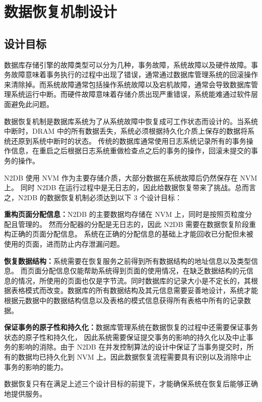 
\chapter{数据恢复机制设计}
\label{chap:recovery}

\section{设计目标}

数据库存储引擎的故障类型可以分为几种，事务故障，系统故障以及硬件故障。事务故障意味着事务执行的过程中出现了错误，通常通过数据库管理系统的回滚操作来清除掉。而系统故障通常包括操作系统故障以及宕机故障，通常会导致数据库管理系统运行中断。而硬件故障意味着存储介质出现严重错误，系统能难通过软件层面避免此问题。

数据恢复机制是数据库系统为了从系统故障中恢复成可工作状态而设计的。当系统中断时，DRAM 中的所有数据丢失，系统必须根据持久化介质上保存的数据将系统还原到系统中断时的状态。
传统的数据库通常使用日志系统记录所有的事务操作信息，在重启之后根据日志系统重做检查点之后的事务的操作，回滚未提交的事务的操作。

N2DB 使用 NVM 作为主要存储介质，大部分数据在系统故障后仍然保存在 NVM 上。
同时 N2DB 在运行过程中是无日志的，因此给数据恢复带来了挑战。总而言之，N2DB 的数据恢复机制必须达到以下 3 个设计目标：

\textbf{重构页面分配信息：}N2DB 的主要数据均存储在 NVM 上，同时是按照页粒度分配且管理的。
然而分配器的分配是无日志的，因此 N2DB 需要在数据恢复阶段重构正确的页面分配信息。
系统在正确的分配信息的基础上才能回收已分配但未被使用的页面，进而防止内存泄漏问题。

\textbf{恢复数据结构：}系统需要在恢复服务之前得到所有数据结构的地址信息以及类型信息。
而页面分配信息仅能帮助系统得到页面的使用情况，在缺乏数据结构的元信息的情况，所使用的页面也仅是字节流。同时数据库的记录大小是不定长的，其根据表格模式而改变。数据库的所有数据结构及其元信息需要妥善地设计，系统才能根据元数据中的数据结构信息以及表格的模式信息获得所有表格中所有的记录数据。

\textbf{保证事务的原子性和持久化：}数据库管理系统在数据恢复的过程中还需要保证事务状态的原子性和持久化，
因此系统需要保证提交事务的影响的持久化以及中止事务的影响的消除。由于 N2DB 在并发控制算法的设计中保证了当事务提交时，所有的数据均已持久化到 NVM 上。因此数据恢复流程需要具有识别以及消除中止事务的影响的能力。

数据恢复只有在满足上述三个设计目标的前提下，才能确保系统在恢复后能够正确地提供服务。



